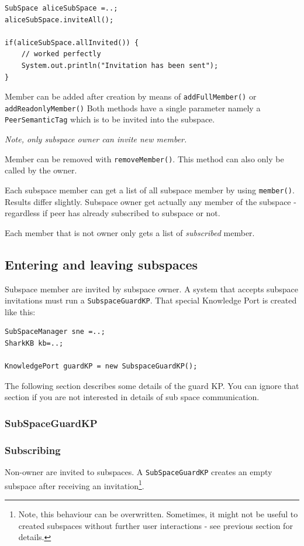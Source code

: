 \begin{verbatim}
SubSpace aliceSubSpace =..;
aliceSubSpace.inviteAll();

if(aliceSubSpace.allInvited()) {
    // worked perfectly
    System.out.println("Invitation has been sent");
}
\end{verbatim}

Member can be added after creation by means of {\verb|addFullMember()|} or
{\verb|addReadonlyMember()|} Both methods have a single parameter namely a \newline
{\verb|PeerSemanticTag|} which is to be invited into the subspace.

{\it Note, only subspace owner can invite new member.}

Member can be removed with {\verb|removeMember()|}. This method can also only be called by the owner.

Each subspace member can get a list of all subspace member by using 
{\verb|member()|}. Results differ slightly. Subspace owner get actually any member
of the subspace - regardless if peer has already subscribed to subspace or not.

Each member that is not owner only gets a list of {\it subscribed} member.

\subsection{Entering and leaving subspaces}
Subspace member are invited by subspace owner. A system that accepts subspace invitations must run a {\verb|SubspaceGuardKP|}. That special Knowledge Port is 
created like this:

\begin{verbatim}
SubSpaceManager sne =..;
SharkKB kb=..;

KnowledgePort guardKP = new SubspaceGuardKP();
\end{verbatim}

The following section describes some details of the guard KP. You can ignore that section if you are not interested in details of sub space communication.

\subsubsection{SubSpaceGuardKP}


\subsubsection{Subscribing}
Non-owner are invited to subspaces. A {\verb|SubSpaceGuardKP|} creates an empty subspace after receiving an invitation\footnote{Note, this behaviour can be overwritten. Sometimes, it might not be useful to created subspaces without
further user interactions - see previous section for details.}.

